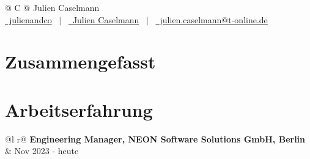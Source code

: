 \documentclass[a4paper,12pt]{article}
\begin{document}
\pagestyle{empty} 



\begin{tabularx}{\linewidth}{@{} C @{}}
\Huge{Julien Caselmann} \\[7.5pt]
\href{https://github.com/julienandco}{\raisebox{-0.05\height}\faGithub\ julienandco} \ $|$ \ 
\href{https://www.linkedin.com/in/julien-caselmann-761a2b177/}{\raisebox{-0.05\height}\faLinkedin\ Julien Caselmann} \ $|$ \ 
\href{mailto:julien.caselmann@t-online.de}{\raisebox{-0.05\height}\faEnvelope \ julien.caselmann@t-online.de} \ 
\end{tabularx}


\section{Zusammengefasst}


\section{Arbeitserfahrung}

\begin{tabularx}{\linewidth}{ @{}l r@{} }
\textbf{Engineering Manager, NEON Software Solutions GmbH, Berlin} & \hfill Nov 2023 - heute \\[3.75pt]
  \\
\end{tabularx}
\end{document}
